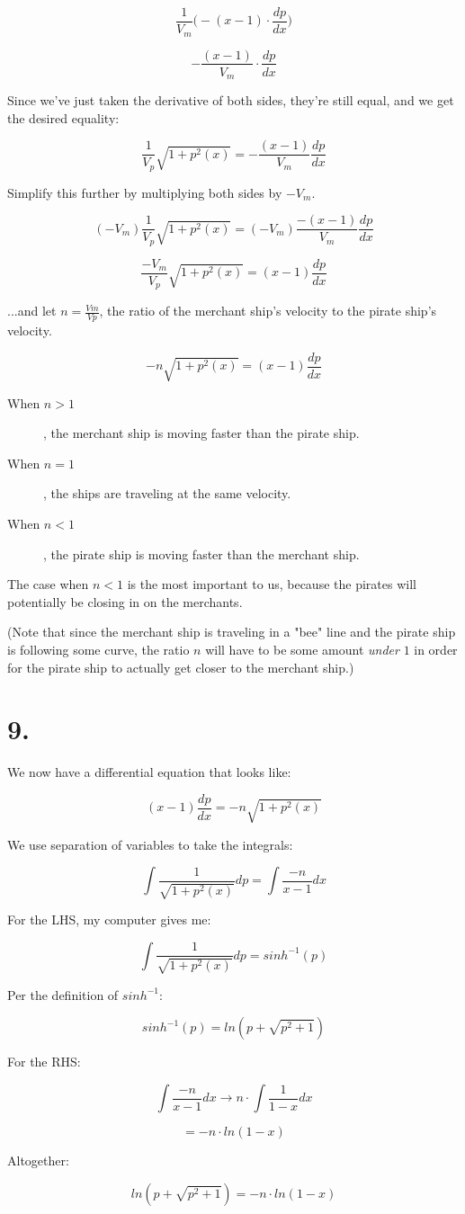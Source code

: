\documentclass[11pt]{report}
\begin{document}
$$
\frac{1}{V_m}
\Big(
	-
	(x-1) \cdot \frac{dp}{dx}
\Big)
$$

$$
-\frac{(x-1)}{V_m}
\cdot \frac{dp}{dx}
$$

Since we've just taken the derivative of both sides, they're still equal, and
we get the desired equality:

$$
\frac{1}{V_p} \sqrt{1 + p^2(x)}
=
-\frac{(x-1)}{V_m} \frac{dp}{dx}
$$

Simplify this further by multiplying both sides by $-V_m$.

$$
(-V_m)
\frac{1}{V_p} \sqrt{1 + p^2(x)}
=
(-V_m)
\frac{-(x-1)}{V_m} \frac{dp}{dx}
$$

$$
\frac{-V_m}{V_p} \sqrt{1 + p^2(x)}
=
(x-1) \frac{dp}{dx}
$$

...and let $n = \frac{Vm}{Vp}$, the ratio of the
merchant ship's velocity to the pirate ship's velocity.

$$
-n \sqrt{1 + p^2(x)}
=
(x-1) \frac{dp}{dx}
$$

\begin{description}

	\item[When $n > 1$], the merchant ship is moving faster than the pirate ship.
	\item[When $n = 1$], the ships are traveling at the same velocity.
	\item[When $n < 1$], the pirate ship is moving faster than the
merchant ship.
\end{description}

The case when $n < 1$ is the most important to us, because the pirates will potentially be closing in on the merchants.

(Note that since the merchant ship is traveling in a "bee" line and the pirate ship is 
following some curve, the ratio $n$ will have to be some amount \emph{under} $1$ in order
for the pirate ship to actually get closer to the merchant ship.)

\section*{9.}

We now have a differential equation that looks like:

$$
(x-1) \frac{dp}{dx}
=
-n \sqrt{1 + p^2(x)}
$$

We use separation of variables to take the integrals:

$$
\int \frac{1}{\sqrt{1 + p^2(x)}} dp
=
\int \frac{-n}{x-1} dx
$$

For the LHS, my computer gives me:

$$
\int \frac{1}{\sqrt{1 + p^2(x)}} dp
=
sinh^{-1}(p)
$$

Per the definition of $sinh^{-1}$:

$$
sinh^{-1}(p) = ln(p + \sqrt{p^2 + 1})
$$

For the RHS:

$$
\int \frac{-n}{x-1} dx
\rightarrow
n \cdot \int \frac{1}{1-x} dx
$$

$$ = -n \cdot ln(1-x) $$

Altogether:

$$
ln(p + \sqrt{p^2 + 1})
=
-n \cdot ln(1-x)
$$
\end{document}
